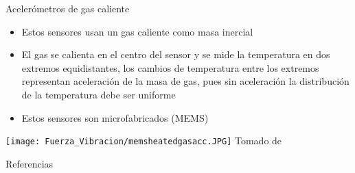 \documentclass[aspectratio=169]{beamer}
\begin{document}
\begin{frame}{Acelerómetros de gas caliente}
            \begin{itemize}
                \item Estos sensores usan un gas caliente como masa inercial
                \item El gas se calienta en el centro del sensor y se mide la temperatura en dos extremos equidistantes, los cambios de temperatura entre los extremos representan aceleración de la masa de gas, pues sin aceleración la distribución de la temperatura debe ser uniforme
                \item Estos sensores son microfabricados (MEMS)
            \end{itemize}
            \centering
            \texttt{[image: Fuerza\_Vibracion/memsheatedgasacc.JPG]}
            \tiny{Tomado de \cite{Fraden_2016}}
\end{frame}

\begin{frame}{Referencias}

\footnotesize

\end{frame}
\end{document}
